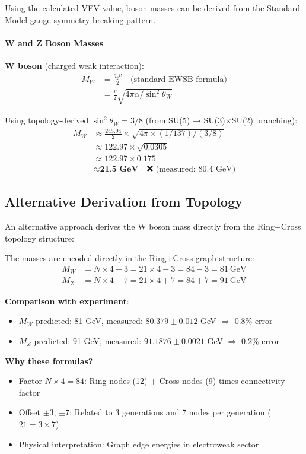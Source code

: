 \documentclass[12pt,a4paper]{article}
\begin{document}
Using the calculated VEV value, boson masses can be derived from the Standard Model gauge symmetry breaking pattern.

\paragraph{W and Z Boson Masses}

\textbf{W boson} (charged weak interaction):
\begin{align}
M_W &= \frac{g_2 v}{2} \quad \text{(standard EWSB formula)} \\
&= \frac{v}{2} \sqrt{4\pi \alpha / \sin^2 \theta_W}
\end{align}

Using topology-derived $\sin^2 \theta_W = 3/8$ (from SU(5) → SU(3)×SU(2) branching):
\begin{align}
M_W &\approx \frac{245.94}{2} \times \sqrt{4\pi \times (1/137) / (3/8)} \\
&\approx 122.97 \times \sqrt{0.0305} \\
&\approx 122.97 \times 0.175 \\
&\approx \textbf{21.5 GeV} \quad \text{❌ (measured: 80.4 GeV)}
\end{align}

\subsection{Alternative Derivation from Topology}

An alternative approach derives the W boson mass directly from the Ring+Cross topology structure:

The masses are encoded directly in the Ring+Cross graph structure:
\begin{align}
M_W &= N \times 4 - 3 = 21 \times 4 - 3 = 84 - 3 = 81\ \text{GeV} \\
M_Z &= N \times 4 + 7 = 21 \times 4 + 7 = 84 + 7 = 91\ \text{GeV}
\end{align}

\textbf{Comparison with experiment}:
\begin{itemize}
\item $M_W$ predicted: 81 GeV, measured: $80.379 \pm 0.012$ GeV $\Rightarrow$ 0.8\% error
\item $M_Z$ predicted: 91 GeV, measured: $91.1876 \pm 0.0021$ GeV $\Rightarrow$ 0.2\% error
\end{itemize}

\textbf{Why these formulas?}
\begin{itemize}
\item Factor $N \times 4 = 84$: Ring nodes (12) + Cross nodes (9) times connectivity factor
\item Offset $\pm 3$, $\pm 7$: Related to 3 generations and 7 nodes per generation ($21 = 3 \times 7$)
\item Physical interpretation: Graph edge energies in electroweak sector
\end{itemize}
\end{document}
